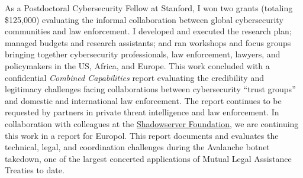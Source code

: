 \documentclass[11pt]{letter}
\begin{document}
\begin{letter}
As a Postdoctoral Cybersecurity Fellow at Stanford, I won two grants (totaling \$125,000) evaluating the informal collaboration between global  cybersecurity communities and law enforcement.
%
%
I developed and executed the research plan; managed budgets and research assistants; and ran workshops and focus groups bringing together cybersecurity professionals, law enforcement, lawyers, and policymakers in the US, Africa, and Europe.
%
This work concluded with a confidential \emph{Combined Capabilities} report evaluating the credibility and legitimacy challenges facing collaborations between cybersecurity ``trust groups'' and domestic and international law enforcement.
%
The report continues to be requested by partners in private threat intelligence and law enforcement.
%
%
In collaboration with colleagues at the \href{https://www.shadowserver.org/}{Shadowserver Foundation}, we are continuing this work in a report for Europol.
%
This report documents and evaluates the technical, legal, and coordination challenges during the Avalanche botnet takedown, one of the largest concerted applications of Mutual Legal Assistance Treaties to date.


%


\end{letter}
\end{document}
